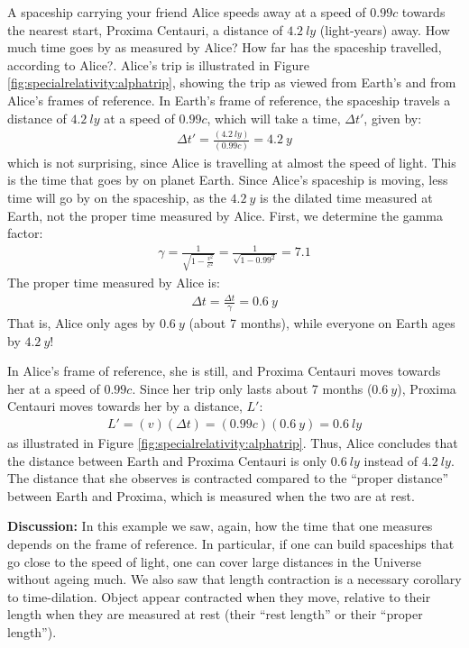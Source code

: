 \begin{example}{\label{ex:specialrelativity:alphatrip}A spaceship carrying your friend Alice speeds away at a speed of $0.99c$ towards the nearest start, Proxima Centauri, a distance of $\SI{4.2}{ly}$ (light-years) away. How much time goes by as measured by Alice? How far has the spaceship travelled, according to Alice?.}
Alice's trip is illustrated in Figure \ref{fig:specialrelativity:alphatrip}, showing the trip as viewed from Earth's and from Alice's frames of reference.
In Earth's frame of reference, the spaceship travels a distance of $\SI{4.2}{ly}$ at a speed of $0.99c$, which will take a time, $\Delta t'$, given by:
\begin{align*}
\Delta t' = \frac{(\SI{4.2}{ly})}{(0.99c)}=\SI{4.2}{y}
\end{align*}
which is not surprising, since Alice is travelling at almost the speed of light. This is the time that goes by on planet Earth. Since Alice's spaceship is moving, less time will go by on the spaceship, as the $\SI{4.2}{y}$ is the dilated time measured at Earth, not the proper time measured by Alice. First, we determine the gamma factor:
\begin{align*}
\gamma = \frac{1}{\sqrt{1-\frac{v^2}{c^2}}} =\frac{1}{\sqrt{1-0.99^2}}=7.1
\end{align*}
The proper time measured by Alice is:
\begin{align*}
\Delta t = \frac{\Delta t}{\gamma}=\SI{0.6}{y}
\end{align*}
That is, Alice only ages by $\SI{0.6}{y}$ (about 7 months), while everyone on Earth ages by $\SI{4.2}{y}$!

In Alice's frame of reference, she is still, and Proxima Centauri moves towards her at a speed of $0.99c$. Since her trip only lasts about 7 months ($\SI{0.6}{y}$), Proxima Centauri moves towards her by a distance, $L'$:
\begin{align*}
L'=(v)(\Delta t)=(0.99c)(\SI{0.6}{y})=\SI{0.6}{ly}
\end{align*}
as illustrated in Figure \ref{fig:specialrelativity:alphatrip}. Thus, Alice concludes that the distance between Earth and Proxima Centauri is only $\SI{0.6}{ly}$ instead of $\SI{4.2}{ly}$. The distance that she observes is contracted compared to the ``proper distance'' between Earth and Proxima, which is measured when the two are at rest.

\textbf{Discussion: }In this example we saw, again, how the time that one measures depends on the frame of reference. In particular, if one can build spaceships that go close to the speed of light, one can cover large distances in the Universe without ageing much. We also saw that length contraction is a necessary corollary to time-dilation. Object appear contracted when they move, relative to their length when they are measured at rest (their ``rest length'' or their ``proper length'').
\end{example}
